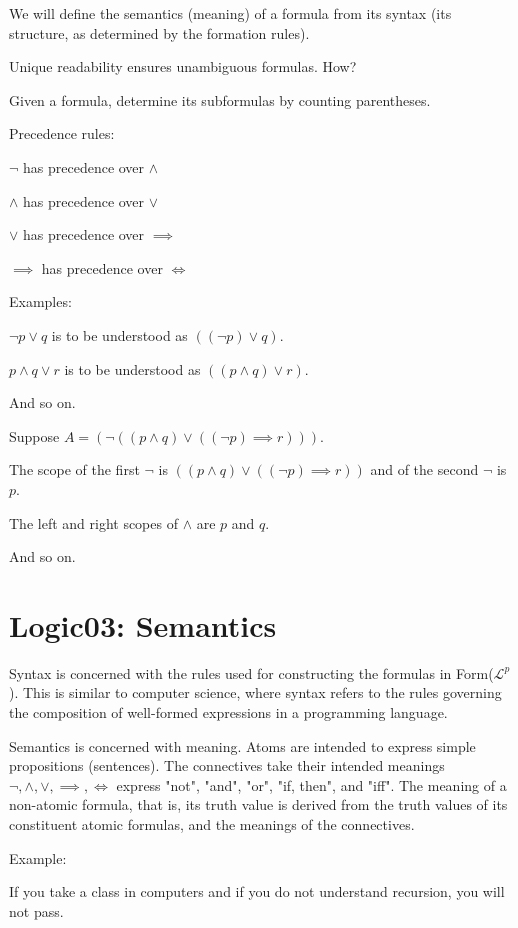 \documentclass{article}
\begin{document}
We will define the semantics (meaning) of a formula from its syntax (its structure, as determined by the formation rules). 

Unique readability ensures unambiguous formulas. How?

Given a formula, determine its subformulas by counting parentheses. 

Precedence rules:

$\neg$ has precedence over $\wedge$ 

$\wedge$ has precedence over $\vee$

$\vee$ has precedence over $\implies$

$\implies$ has precedence over $\iff$

Examples:

$\neg p \vee q$ is to be understood as $((\neg p) \vee q)$. 

$p \wedge q \vee r$ is to be understood as $((p \wedge q) \vee r)$.

And so on.

Suppose $A = (\neg ((p \wedge q) \vee ((\neg p) \implies r)))$.

The scope of the first $\neg$ is $((p \wedge q) \vee ((\neg p) \implies r))$ and of the second $\neg$ is $p$. 

The left and right scopes of $\wedge$ are $p$ and $q$. 

And so on.  


\section{Logic03: Semantics}

Syntax is concerned with the rules used for constructing the formulas in Form($\mathcal{L}^p$). This is similar to computer science, where syntax refers to the rules governing the composition of well-formed expressions in a programming language. 

Semantics is concerned with meaning. Atoms are intended to express simple propositions (sentences). The connectives take their intended meanings $\neg, \wedge, \vee, \implies, \iff$ express "not", "and", "or", "if, then", and "iff". The meaning of a non-atomic formula, that is, its truth value is derived from the truth values of its constituent atomic formulas, and the meanings of the connectives. 

Example:

If you take a class in computers and if you do not understand recursion, you will not pass. 
\end{document}
